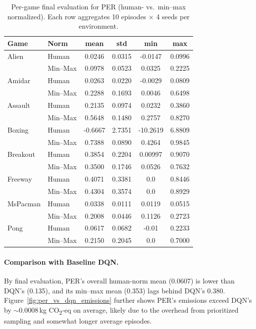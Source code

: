 \begin{table}
	\caption{Per-game final evaluation for PER (human- vs.\ min--max normalized). Each row aggregates 10 episodes $\times$ 4 seeds per environment.}
	\label{tab:per_eval_gamewise}
	\centering
	\begin{tabular}{llcccc}
		\toprule
		\textbf{Game} & \textbf{Norm} & \textbf{mean} & \textbf{std} & \textbf{min} & \textbf{max}\\
		\midrule
		Alien     & Human    & 0.0246 & 0.0315 & -0.0147 & 0.0996 \\
		& Min--Max & 0.0978 & 0.0523 & 0.0325  & 0.2225 \\
		\cmidrule{1-6}
		Amidar    & Human    & 0.0263 & 0.0220 & -0.0029 & 0.0809 \\
		& Min--Max & 0.2288 & 0.1693 & 0.0046  & 0.6498 \\
		\cmidrule{1-6}
		Assault   & Human    & 0.2135 & 0.0974 & 0.0232  & 0.3860 \\
		& Min--Max & 0.5648 & 0.1480 & 0.2757  & 0.8270 \\
		\cmidrule{1-6}
		Boxing    & Human    & -0.6667 & 2.7351 & -10.2619 & 6.8809 \\
		& Min--Max & 0.7388  & 0.0890 & 0.4264    & 0.9845 \\
		\cmidrule{1-6}
		Breakout  & Human    & 0.3854 & 0.2204 & 0.00997 & 0.9070 \\
		& Min--Max & 0.3500 & 0.1746 & 0.0526  & 0.7632 \\
		\cmidrule{1-6}
		Freeway   & Human    & 0.4071 & 0.3381 & 0.0     & 0.8446 \\
		& Min--Max & 0.4304 & 0.3574 & 0.0     & 0.8929 \\
		\cmidrule{1-6}
		MsPacman  & Human    & 0.0338 & 0.0111 & 0.0119 & 0.0515 \\
		& Min--Max & 0.2008 & 0.0446 & 0.1126 & 0.2723 \\
		\cmidrule{1-6}
		Pong      & Human    & 0.0617 & 0.0682 & -0.01 & 0.2233 \\
		& Min--Max & 0.2150 & 0.2045 & 0.0   & 0.7000 \\
		\bottomrule
	\end{tabular}
\end{table}

\paragraph{Comparison with Baseline DQN.}
By final evaluation, PER’s overall human-norm mean (0.0607) is lower than DQN's (0.135), and its min--max mean (0.353) lags behind DQN's 0.380.  
Figure~\ref{fig:per_vs_dqn_emissions} further shows PER’s emissions exceed DQN's by $\sim0.0008$\,kg CO\textsubscript{2}-eq on average, likely due to the overhead from prioritized sampling and somewhat longer average episodes.

